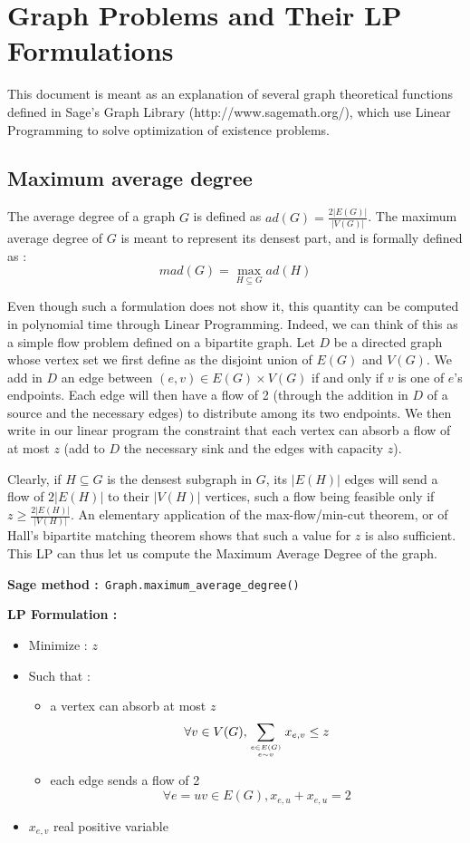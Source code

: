 
\chapter{Graph Problems and Their LP Formulations}

This document is meant as an explanation of several graph theoretical functions defined in Sage's Graph Library (http://www.sagemath.org/), which use Linear Programming to solve optimization of existence problems.



\section{Maximum average degree}
\label{lp:mad}

The average degree of a graph $G$ is defined as $ad(G) = \frac {2|E(G)|}{|V(G)|}$. The maximum average degree of $G$ is meant to represent its densest part, and is formally defined as : $$mad(G) = \max_{H\subseteq G}ad(H)$$

Even though such a formulation does not show it, this quantity can be computed in polynomial time through Linear Programming. Indeed, we can think of this as a simple flow problem defined on a bipartite graph. Let $D$ be a directed graph whose vertex set we first define as the disjoint union of $E(G)$ and $V(G)$. We add in $D$ an edge between $(e,v)\in E(G)\times V(G)$ if and only if $v$ is one of $e$'s endpoints. Each edge will then have a flow of 2 (through the addition in $D$ of a source and the necessary edges) to distribute among its two endpoints. We then write in our linear program the constraint that each vertex can absorb a flow of at most $z$ (add to $D$ the necessary sink and the edges with capacity $z$).

Clearly, if $H\subseteq G$ is the densest subgraph in $G$, its $|E(H)|$ edges will send a flow of $2|E(H)|$ to their $|V(H)|$ vertices, such a flow being feasible only if $z\geq \frac {2|E(H)|}{|V(H)|}$. An elementary application of the max-flow/min-cut theorem, or of Hall's bipartite matching theorem shows that such a value for $z$ is also sufficient. This LP can thus let us compute the Maximum Average Degree of the graph.

{\bf Sage method :}\verb! Graph.maximum_average_degree()!

{\bf LP Formulation :}
\begin{itemize}
\item Minimize : $z$\\
\item Such that :
  \begin{itemize}
  \item     a vertex can absorb at most $z$
    $$\forall v\in V(G), \sum_{e\in E(G)\atop e\sim v}x_{e,v}\leq z$$
\item each edge sends a flow of 2
  $$\forall e=uv\in E(G), x_{e,u} + x_{e,u} = 2$$
  \end{itemize}
  \item $x_{e,v}$ real positive variable
\end{itemize}


